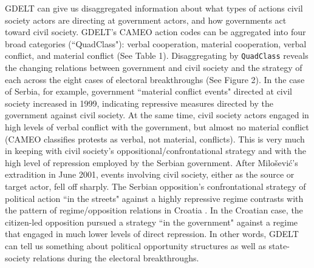 \documentclass[10pt]{article}
\begin{document}
GDELT can give us disaggregated information about what types of actions civil society actors are directing at government actors, and how governments act toward civil society. GDELT's CAMEO action codes can be aggregated into four broad categories (``QuadClass"): verbal cooperation, material cooperation, verbal conflict, and material conflict (See Table 1).  Disaggregating by \texttt{QuadClass} reveals the changing relations between government and civil society and the strategy of each across the eight cases of electoral breakthroughs (See Figure 2).  In the case of Serbia, for example, government  ``material conflict events" directed at civil society  increased in 1999, indicating repressive measures directed by the government against civil society.  At the same time, civil society actors engaged in high levels of verbal conflict with the government, but almost no material conflict (CAMEO classifies protests as verbal, not material, conflicts). This is very much in keeping with civil society's oppositional/confrontational strategy and with the high level of repression employed by the Serbian government. After Milo\v{s}evi\'{c}'s extradition in June 2001, events involving civil society, either as the source or target actor, fell off sharply. The Serbian opposition's confrontational strategy of political action ``in the streets" against a highly repressive regime contrasts with the pattern of regime/opposition relations in Croatia \citep{irvine2013electoral}.  In the Croatian case, the citizen-led opposition pursued a strategy ``in the government" against a regime that engaged in much lower levels of direct repression.  In other words, GDELT can tell us something about political opportunity structures as well as state-society relations during the electoral breakthroughs.
\end{document}
